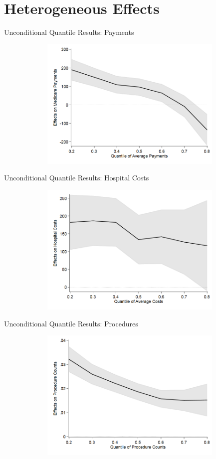 \documentclass[t,aspectratio=169]{beamer}
\begin{document}
\section{Heterogeneous Effects}
\begin{frame}{Unconditional Quantile Results: Payments}
    \begin{figure}
        \centering
        \includegraphics[height=2.5in,width=5in,keepaspectratio]{QReg_Payment}
    \end{figure}
\end{frame}

\begin{frame}{Unconditional Quantile Results: Hospital Costs}
    \begin{figure}
        \centering
        \includegraphics[height=2.5in,width=5in,keepaspectratio]{QReg_Charge}
    \end{figure}
\end{frame}

\begin{frame}{Unconditional Quantile Results: Procedures}
    \begin{figure}
        \centering
        \includegraphics[height=2.5in,width=5in,keepaspectratio]{QReg_Procs}
    \end{figure}
\end{frame}
\end{document}
